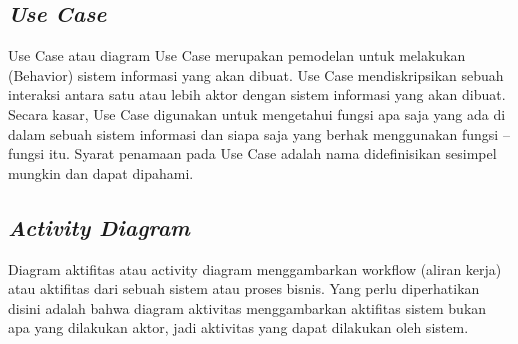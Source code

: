 \subsection{\textit{Use Case}}
\noindent

Use Case atau diagram Use Case merupakan 
pemodelan untuk melakukan (Behavior) sistem 
informasi yang akan dibuat. Use Case
mendiskripsikan sebuah interaksi antara satu 
atau lebih aktor dengan sistem informasi yang 
akan dibuat. Secara kasar, Use Case digunakan 
untuk mengetahui fungsi apa saja yang ada di 
dalam sebuah sistem informasi dan siapa saja 
yang berhak menggunakan fungsi – fungsi itu. 
Syarat penamaan pada Use Case adalah nama 
didefinisikan sesimpel mungkin dan dapat 
dipahami\cite{mandiri2013pembuatan}. 

\subsection{\textit{Activity Diagram}}
\noindent

Diagram aktifitas atau activity diagram
menggambarkan workflow (aliran kerja) atau 
aktifitas dari sebuah sistem atau proses bisnis. 
Yang perlu diperhatikan disini adalah bahwa 
diagram aktivitas menggambarkan aktifitas 
sistem bukan apa yang dilakukan aktor, jadi 
aktivitas yang dapat dilakukan oleh sistem\cite{mandiri2013pembuatan}.





